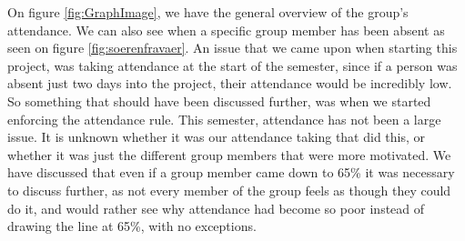 On figure \ref{fig:GraphImage}, we have the general overview of the group's attendance.
We can also see when a specific group member has been absent as seen on figure \ref{fig:soerenfravaer}.
An issue that we came upon when starting this project, was taking attendance at the start of the semester, since if a person was absent just two days into the project, their attendance would be incredibly low. 
So something that should have been discussed further, was when we started enforcing the attendance rule. 
This semester, attendance has not been a large issue. 
It is unknown whether it was our attendance taking that did this, or whether it was just the different group members that were more motivated.
We have discussed that even if a group member came down to 65\% it was necessary to discuss further, as not every member of the group feels as though they could do it, and would rather see why attendance had become so poor instead of drawing the line at 65\%, with no exceptions.

